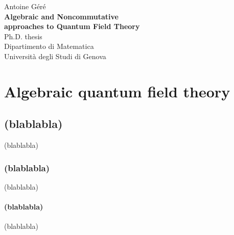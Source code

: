 \documentclass[a4paper]{book}
\newcommand*{\titleTH}{%
%
\raggedright%
%
\vspace*{44pt}%
%
{\LARGE Antoine Géré}\\[\baselineskip]%
%
\vspace*{100pt}%
%
{\Huge\bfseries Algebraic and Noncommutative \\[8pt] approaches to Quantum Field Theory}\\[\baselineskip]%
%
\vspace*{22pt}%
%
{\LARGE Ph.D. thesis}\\[\baselineskip]%
%
\vspace*{44pt}%
%
{\LARGE Dipartimento di Matematica}\\[\baselineskip]%
%
{\LARGE Università degli Studi di Genova}\\[\baselineskip]%
%
\vfill %
%
}%
\begin{document}

\clearpage\titleTH
\thispagestyle{empty}


\tableofcontents

\part{Algebraic quantum field theory}

\chapter{(blablabla)}

(blablabla)

\section{(blablabla)}

(blablabla)

\subsection{(blablabla)}

(blablabla)


\nocite{*}





\end{document}
